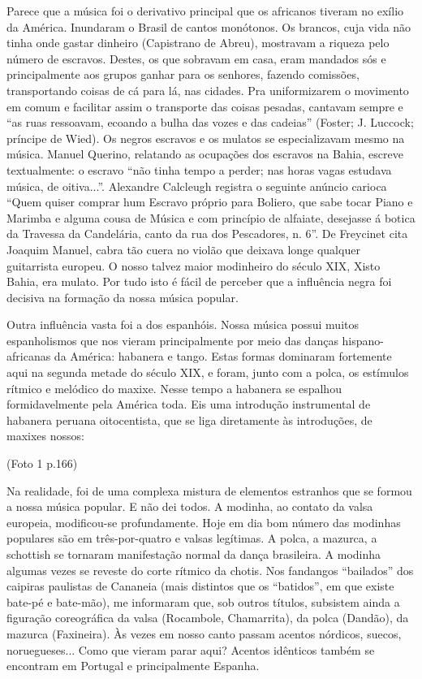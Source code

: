 Parece que a música foi o derivativo principal que os africanos tiveram
no exílio da América. Inundaram o Brasil de cantos monótonos. Os
brancos, cuja vida não tinha onde gastar dinheiro (Capistrano de Abreu),
mostravam a riqueza pelo número de escravos. Destes, os que sobravam em
casa, eram mandados sós e principalmente aos grupos ganhar para os
senhores, fazendo comissões, transportando coisas de cá para lá, nas
cidades. Pra uniformizarem o movimento em comum e facilitar assim o
transporte das coisas pesadas, cantavam sempre e ``as ruas ressoavam,
ecoando a bulha das vozes e das cadeias'' (Foster; J. Luccock; príncipe
de Wied). Os negros escravos e os mulatos se especializavam mesmo na
música. Manuel Querino, relatando as ocupações dos escravos na Bahia,
escreve textualmente: o escravo ``não tinha tempo a perder; nas horas
vagas estudava música, de oitiva...''. Alexandre Calcleugh registra o
seguinte anúncio carioca ``Quem quiser comprar hum Escravo próprio para
Boliero, que sabe tocar Piano e Marimba e alguma cousa de Música e com
princípio de alfaiate, desejasse á botica da Travessa da Candelária,
canto da rua dos Pescadores, n. 6''. De Freycinet cita Joaquim Manuel,
cabra tão cuera no violão que deixava longe qualquer guitarrista
europeu. O nosso talvez maior modinheiro do século XIX, Xisto Bahia, era
mulato. Por tudo isto é fácil de perceber que a influência negra foi
decisiva na formação da nossa música popular.

Outra influência vasta foi a dos espanhóis. Nossa música possui muitos
espanholismos que nos vieram principalmente por meio das danças
hispano-africanas da América: habanera e tango. Estas formas dominaram
fortemente aqui na segunda metade do século XIX, e foram, junto com a
polca, os estímulos rítmico e melódico do maxixe. Nesse tempo a habanera
se espalhou formidavelmente pela América toda. Eis uma introdução
instrumental de habanera peruana oitocentista, que se liga diretamente
às introduções, de maxixes nossos:

(Foto 1 p.166)

Na realidade, foi de uma complexa mistura de elementos estranhos que se
formou a nossa música popular. E não dei todos. A modinha, ao contato da
valsa europeia, modificou-se profundamente. Hoje em dia bom número das
modinhas populares são em três-por-quatro e valsas legítimas. A polca, a
mazurca, a schottish se tornaram manifestação normal da dança
brasileira. A modinha algumas vezes se reveste do corte rítmico da
chotis. Nos fandangos ``bailados'' dos caipiras paulistas de Cananeia
(mais distintos que os ``batidos'', em que existe bate-pé e bate-mão),
me informaram que, sob outros títulos, subsistem ainda a figuração
coreográfica da valsa (Rocambole, Chamarrita), da polca (Dandão), da
mazurca (Faxineira). Às vezes em nosso canto passam acentos nórdicos,
suecos, noruegueses... Como que vieram parar aqui? Acentos idênticos
também se encontram em Portugal e principalmente Espanha.

